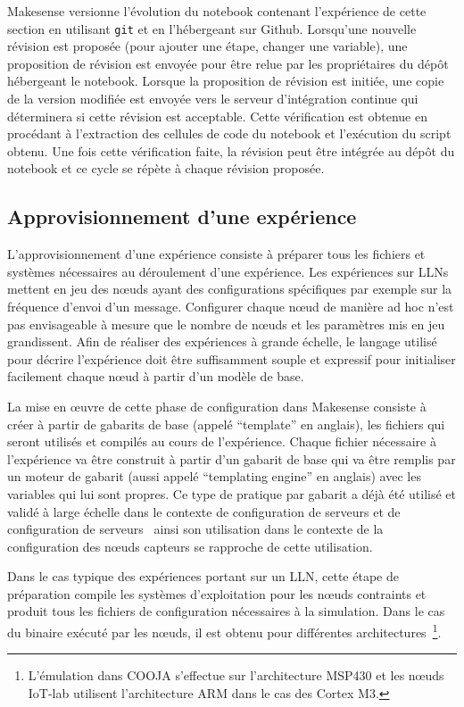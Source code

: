 Makesense versionne l'évolution du notebook contenant l'expérience de cette section en utilisant \texttt{git} et en l'hébergeant sur Github.
Lorsqu'une nouvelle révision est proposée (pour ajouter une étape, changer une variable), une proposition de révision est envoyée pour être relue par les propriétaires du dépôt hébergeant le notebook.
Lorsque la proposition de révision est initiée, une copie de la version modifiée est envoyée vers le serveur d'intégration continue qui déterminera si cette révision est acceptable.
Cette vérification est obtenue en procédant à l'extraction des cellules de code du notebook et l'exécution du script obtenu.
Une fois cette vérification faite, la révision peut être intégrée au dépôt du notebook et ce cycle se répète à chaque révision proposée.

\subsection{Approvisionnement d'une expérience}

L'approvisionnement d'une expérience consiste à préparer tous les fichiers et systèmes nécessaires au déroulement d'une expérience.
Les expériences sur \ac{LLN}s mettent en jeu des nœuds ayant des configurations spécifiques par exemple sur la fréquence d'envoi d'un message.
Configurer chaque nœud de manière ad hoc n'est pas envisageable à mesure que le nombre de nœuds et les paramètres mis en jeu grandissent.
Afin de réaliser des expériences à grande échelle, le langage utilisé pour décrire l'expérience doit être suffisamment souple et expressif pour initialiser facilement chaque nœud à partir d'un modèle de base.

La mise en œuvre de cette phase de configuration dans Makesense consiste à créer à partir de gabarits de base (appelé ``template'' en anglais), les fichiers qui seront utilisés et compilés au cours de l'expérience.
Chaque fichier nécessaire à l'expérience va être construit à partir d'un gabarit de base qui va être remplis par un moteur de gabarit (aussi appelé ``templating engine'' en anglais) avec les variables qui lui sont propres.
Ce type de pratique par gabarit a déjà été utilisé et validé à large échelle dans le contexte de configuration de serveurs et de configuration de serveurs~\cite{hochstein2014ansible} ainsi son utilisation dans le contexte de la configuration des nœuds capteurs se rapproche de cette utilisation.

Dans le cas typique des expériences portant sur un \ac{LLN}, cette étape de préparation compile les systèmes d'exploitation pour les nœuds contraints et produit tous les fichiers de configuration nécessaires à la simulation.
Dans le cas du binaire exécuté par les nœuds, il est obtenu pour différentes architectures~\footnote{L'émulation dans COOJA s'effectue sur l'architecture MSP430 et les nœuds IoT-lab utilisent l'architecture ARM dans le cas des Cortex M3.}.

